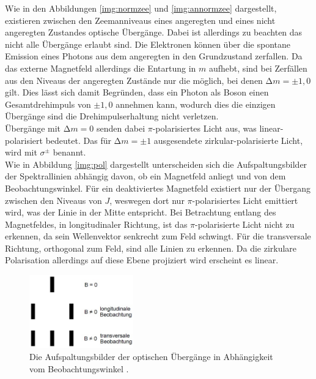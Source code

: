 \noindent 
Wie in den Abbildungen \autoref{img:normzee} und \autoref{img:annormzee} dargestellt, existieren zwischen den Zeemanniveaus eines angeregten und eines nicht angeregten Zustandes optische Übergänge.
Dabei ist allerdings zu beachten das nicht alle Übergänge erlaubt sind. 
Die Elektronen können über die spontane Emission eines Photons aus dem angeregten in den Grundzustand zerfallen.
Da das externe Magnetfeld allerdings die Entartung in $m$ aufhebt, sind bei Zerfällen aus den Niveaus der angeregten Zustände nur die möglich, bei denen $\increment m = \pm 1, 0$ gilt.
Dies lässt sich damit Begründen, dass ein Photon als Boson einen Gesamtdrehimpuls von $\pm 1, 0 $ annehmen kann, wodurch dies die einzigen Übergänge sind die Drehimpulserhaltung nicht verletzen.\\
Übergänge mit $\increment m = 0$ senden dabei $\pi$-polarisiertes Licht aus, was linear-polarisiert bedeutet.
Das für $\increment m = \pm 1$ ausgesendete zirkular-polarisierte Licht, wird mit $\sigma^{\pm}$ benannt.\\
Wie in Abbildung \autoref{img:pol} dargestellt unterscheiden sich die Aufspaltungsbilder der Spektrallinien abhängig davon, ob ein Magnetfeld anliegt und von dem Beobachtungswinkel.
Für ein deaktiviertes Magnetfeld existiert nur der Übergang zwischen den Niveaus von $J$, weswegen dort nur $\pi$-polarisiertes Licht emittiert wird, was der Linie in der Mitte entspricht.
Bei Betrachtung entlang des Magnetfeldes, in longitudinaler Richtung, ist das $\pi$-polarisierte Licht nicht zu erkennen, da sein Wellenvektor senkrecht zum Feld schwingt.
Für die transversale Richtung, orthogonal zum Feld, sind alle Linien zu erkennen. Da die zirkulare Polarisation allerdings auf diese Ebene projiziert wird erscheint es linear.


\begin{figure}[H]
    \centering
    \includegraphics[width=0.4\textwidth]{latex/images/polarisation.PNG}
    \caption{Die Aufspaltungsbilder der optischen Übergänge in Abhängigkeit vom Beobachtungswinkel \protect \cite{alt}.}
    \label{img:pol}
\end{figure}


